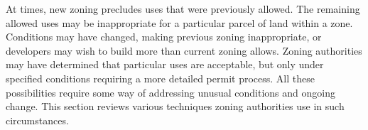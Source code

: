 At times, new zoning precludes uses that were previously allowed. The remaining
allowed uses may be inappropriate for a particular parcel of land within a zone.
Conditions may have changed, making previous zoning inappropriate, or developers
may wish to build more than current zoning allows. Zoning authorities may have
determined that particular uses are acceptable, but only under specified
conditions requiring a more detailed permit process. All these possibilities
require some way of addressing unusual conditions and ongoing change. This
section reviews various techniques zoning authorities use in such circumstances.

